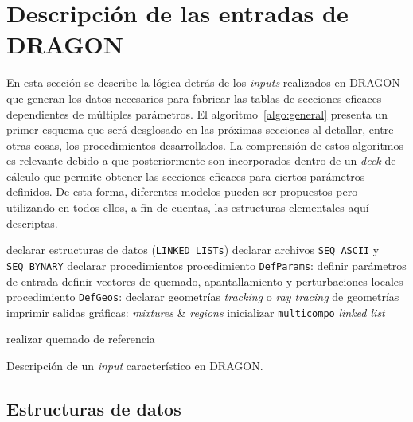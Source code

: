 \documentclass[11pt]{article}
\begin{document}
\section{Descripción de las entradas de DRAGON}
\label{sec:desc-inputs-dragon}

En esta sección se describe la lógica detrás de los \emph{inputs} realizados en DRAGON que generan los datos necesarios para fabricar las tablas de secciones eficaces dependientes de múltiples parámetros. El algoritmo~\ref{algo:general} presenta un primer esquema que será desglosado en las próximas secciones al detallar, entre otras cosas, los procedimientos desarrollados. La comprensión de estos algoritmos es relevante debido a que posteriormente son incorporados dentro de un \emph{deck} de cálculo que permite obtener las secciones eficaces para ciertos parámetros definidos. De esta forma, diferentes modelos pueden ser propuestos pero utilizando en todos ellos, a fin de cuentas, las estructuras elementales aquí descriptas.


\medskip
\begin{algorithm}[H]

 
 declarar estructuras de datos (\texttt{LINKED_LISTs})\;
 declarar archivos \texttt{SEQ\_ASCII}  y \texttt{SEQ\_BYNARY}\;
 declarar procedimientos\;
 procedimiento \texttt{DefParams}: definir parámetros de entrada\;
 definir vectores de quemado, apantallamiento y perturbaciones locales\;
 procedimiento \texttt{DefGeos}: declarar geometrías\;
 \emph{tracking} o \emph{ray tracing} de geometrías\;
 imprimir salidas gráficas: \emph{mixtures} \& \emph{regions}\;
 inicializar \texttt{multicompo} \emph{linked list}\;

 realizar quemado de referencia\;
 
 
 \caption{Descripción de un \emph{input} característico en DRAGON.\label{algo:general}}
\end{algorithm}
\medskip


\subsection{Estructuras de datos}
\end{document}
